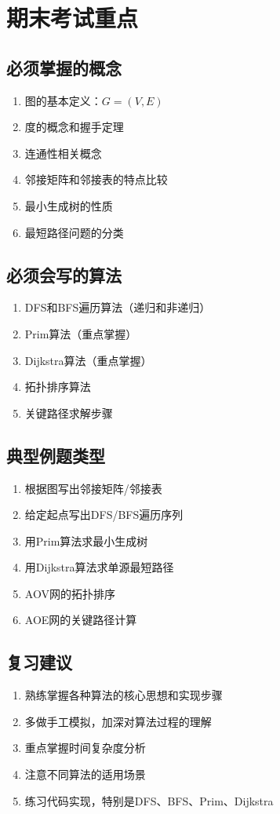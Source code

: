 \documentclass[12pt,a4paper]{amsart}
\begin{document}
\section{期末考试重点}

\subsection{必须掌握的概念}
\begin{enumerate}
    \item 图的基本定义：$G=(V,E)$
    \item 度的概念和握手定理
    \item 连通性相关概念
    \item 邻接矩阵和邻接表的特点比较
    \item 最小生成树的性质
    \item 最短路径问题的分类
\end{enumerate}

\subsection{必须会写的算法}
\begin{enumerate}
    \item DFS和BFS遍历算法（递归和非递归）
    \item Prim算法（重点掌握）
    \item Dijkstra算法（重点掌握）
    \item 拓扑排序算法
    \item 关键路径求解步骤
\end{enumerate}

\subsection{典型例题类型}
\begin{enumerate}
    \item 根据图写出邻接矩阵/邻接表
    \item 给定起点写出DFS/BFS遍历序列
    \item 用Prim算法求最小生成树
    \item 用Dijkstra算法求单源最短路径
    \item AOV网的拓扑排序
    \item AOE网的关键路径计算
\end{enumerate}

\subsection{复习建议}
\begin{enumerate}
    \item 熟练掌握各种算法的核心思想和实现步骤
    \item 多做手工模拟，加深对算法过程的理解
    \item 重点掌握时间复杂度分析
    \item 注意不同算法的适用场景
    \item 练习代码实现，特别是DFS、BFS、Prim、Dijkstra
\end{enumerate}
\end{document}
